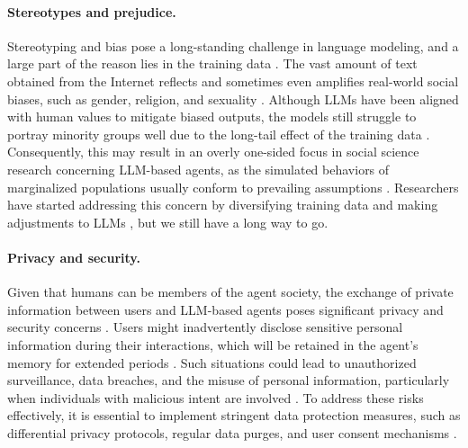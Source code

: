 \paragraph{Stereotypes and prejudice.}
Stereotyping and bias pose a long-standing challenge in language modeling, and a large part of the reason lies in the training data \cite{DBLP:conf/nips/KirkJVIBDSA21, DBLP:conf/acl/NadeemBR20}.
The vast amount of text obtained from the Internet reflects and sometimes even amplifies real-world social biases, such as gender, religion, and sexuality \cite{roberts2018assessing}.
Although LLMs have been aligned with human values to mitigate biased outputs, the models still struggle to portray minority groups well due to the long-tail effect of the training data \cite{pmlr-v202-kandpal23a, DBLP:journals/corr/abs-2304-03738, haller2023opiniongpt}.
Consequently, this may result in an overly one-sided focus in social science research concerning LLM-based agents, as the simulated behaviors of marginalized populations usually conform to prevailing assumptions \cite{DBLP:journals/corr/abs-2305-14930}.
Researchers have started addressing this concern by diversifying training data and making adjustments to LLMs \cite{DBLP:journals/corr/abs-2304-00416, DBLP:conf/icml/LiangWMS21}, but we still have a long way to go.

\paragraph{Privacy and security.}
Given that humans can be members of the agent society, the exchange of private information between users and LLM-based agents poses significant privacy and security concerns \cite{DBLP:conf/aies/0002SAKFLP18}.
Users might inadvertently disclose sensitive personal information during their interactions, which will be retained in the agent's memory for extended periods \cite{DBLP:journals/corr/abs-2305-10250}.
Such situations could lead to unauthorized surveillance, data breaches, and the misuse of personal information, particularly when individuals with malicious intent are involved \cite{DBLP:conf/naacl/0003SF22}.
To address these risks effectively, it is essential to implement stringent data protection measures, such as differential privacy protocols, regular data purges, and user consent mechanisms \cite{DBLP:conf/fat/BrownLMST22, sebastian2023privacy}.


